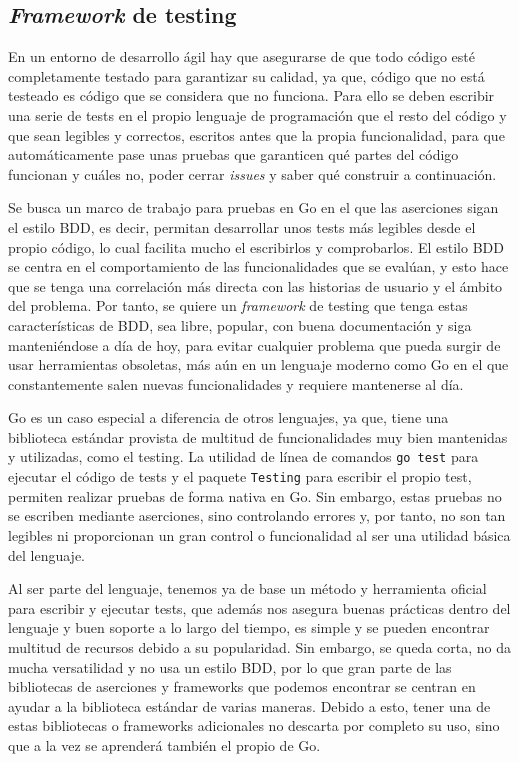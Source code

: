 \subsection{\textit{Framework} de testing} En un entorno de desarrollo ágil hay
que asegurarse de que todo código esté completamente testado para garantizar su
calidad, ya que, código que no está testeado es código que se considera que no
funciona. Para ello se deben escribir una serie de tests en el propio lenguaje
de programación que el resto del código y que sean legibles y correctos,
escritos antes que la propia funcionalidad, para que automáticamente pase unas
pruebas que garanticen qué partes del código funcionan y cuáles no, poder cerrar
\textit{issues} y saber qué construir a continuación.

Se busca un marco de trabajo para pruebas en Go en el que las aserciones sigan
el estilo BDD, es decir, permitan desarrollar unos tests más legibles desde el
propio código, lo cual facilita mucho el escribirlos y comprobarlos. El estilo
BDD se centra en el comportamiento de las funcionalidades que se evalúan, y esto
hace que se tenga una correlación más directa con las historias de usuario y el
ámbito del problema. Por tanto, se quiere un \textit{framework} de testing que
tenga estas características de BDD, sea libre, popular, con buena documentación
y siga manteniéndose a día de hoy, para evitar cualquier problema que pueda
surgir de usar herramientas obsoletas, más aún en un lenguaje moderno como Go en
el que constantemente salen nuevas funcionalidades y requiere mantenerse al día.

Go es un caso especial a diferencia de otros lenguajes, ya que, tiene una
biblioteca estándar provista de multitud de funcionalidades muy bien mantenidas
y utilizadas, como el testing. La utilidad de línea de comandos \texttt{go test}
para ejecutar el código de tests y el paquete \texttt{Testing} para escribir el
propio test, permiten realizar pruebas de forma nativa en Go. Sin embargo, estas
pruebas no se escriben mediante aserciones, sino controlando errores y, por
tanto, no son tan legibles ni proporcionan un gran control o funcionalidad al
ser una utilidad básica del lenguaje.

Al ser parte del lenguaje, tenemos ya de base un método y herramienta oficial
para escribir y ejecutar tests, que además nos asegura buenas prácticas dentro
del lenguaje y buen soporte a lo largo del tiempo, es simple y se pueden
encontrar multitud de recursos debido a su popularidad. Sin embargo, se queda
corta, no da mucha versatilidad y no usa un estilo BDD, por lo que gran parte de
las bibliotecas de aserciones y frameworks que podemos encontrar se centran en
ayudar a la biblioteca estándar de varias maneras. Debido a esto, tener una de
estas bibliotecas o frameworks adicionales no descarta por completo su uso, sino
que a la vez se aprenderá también el propio de Go.

